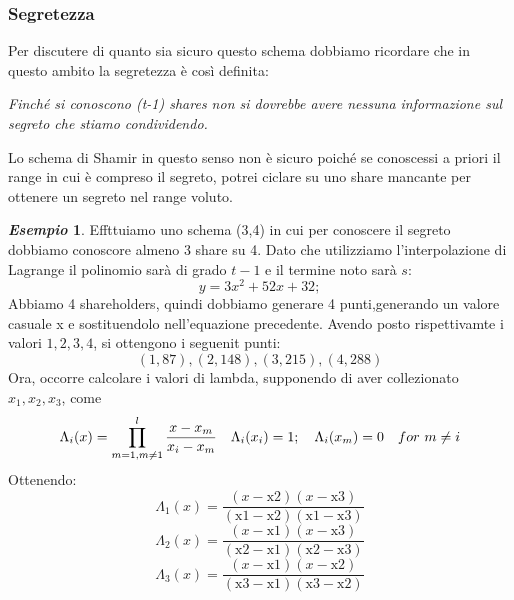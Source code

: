 \documentclass{book}
\theoremstyle{definition}
\newtheorem{esempio}{\emph{Esempio}}
\begin{document}
\subsubsection{Segretezza}
Per discutere di quanto sia sicuro questo schema dobbiamo ricordare che in questo ambito la segretezza è così definita:
\begin{center}
    \emph{Finché si conoscono (t-1) shares non si dovrebbe avere nessuna informazione sul segreto che stiamo condividendo.}
\end{center}
Lo schema di Shamir in questo senso non è sicuro poiché se conoscessi a priori il range in cui è compreso il segreto, potrei ciclare su uno share mancante per ottenere un segreto nel range voluto\@.
\begin{esempio}
    Effttuiamo uno schema (3,4) in cui per conoscere il segreto dobbiamo conoscore almeno 3 share su 4\@. Dato che utilizziamo l'interpolazione di Lagrange il polinomio sarà di grado \(t-1\) e il termine noto sarà \(s\):
    \begin{equation*}
        y=3 x^2+52 x+32;
    \end{equation*}
    Abbiamo 4 shareholders, quindi dobbiamo generare 4 punti,generando un valore casuale x e sostituendolo nell'equazione precedente. Avendo posto rispettivamte i valori \(1,2,3,4\), si ottengono i seguenit punti:
    \begin{equation*}
        (1,87),(2,148),(3,215),(4,288)
    \end{equation*}
    Ora, occorre calcolare i valori di lambda, supponendo di aver collezionato \(x_{1},x_{2},x_{3}\), come
    \begin{equation*}
        \centering
        \Lambda_{i}(x)=\prod_{m=1,m\neq1}^{l}{\frac{x-x_{m}}{x_{i}-x_{m}}}\quad \Lambda_{i}(x_{i})=1;\quad \Lambda_{i}(x_{m})=0\quad for\ m\neq i
    \end{equation*}
    Ottenendo:
    \begin{equation*}
        \Lambda_{1}(x)=\frac{(x-\text{x2}) (x-\text{x3}) }{(\text{x1}-\text{x2}) (\text{x1}-\text{x3}) }
    \end{equation*}
    \begin{equation*}
        \Lambda_{2}(x)=\frac{(x-\text{x1}) (x-\text{x3}) }{(\text{x2}-\text{x1}) (\text{x2}-\text{x3}) }
    \end{equation*}
    \begin{equation*}
        \Lambda_{3}(x)= \frac{(x-\text{x1}) (x-\text{x2}) }{(\text{x3}-\text{x1}) (\text{x3}-\text{x2}) }
    \end{equation*}

\end{esempio}
\end{document}
